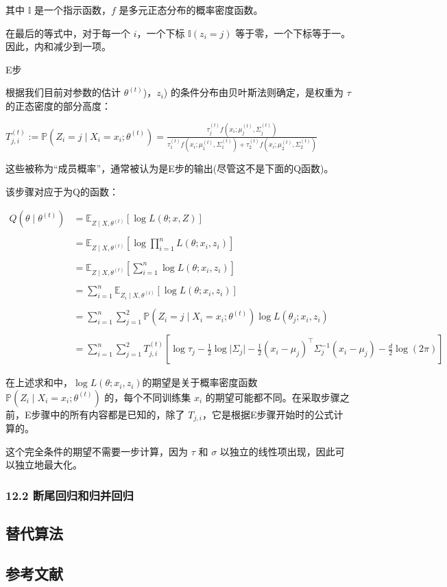 其中 $\mathbb{I}$ 是一个指示函数，$f$ 是多元正态分布的概率密度函数。

在最后的等式中，对于每一个 $i$，一个下标 $\mathbb{I}(z_i = j)$ 等于零，一个下标等于一。因此，内和减少到一项。

E步

根据我们目前对参数的估计 $\theta^{(t)}$)，$z_i$) 的条件分布由贝叶斯法则确定，是权重为 $\tau$ 的正态密度的部分高度：

$T_{j,i}^{(t)} := \mathbb{P}(Z_i = j \mid X_i = x_i; \theta^{(t)}) = \frac{ \tau_j^{(t)} f(x_i; \mu_j^{(t)}, \Sigma_j^{(t)})}{ \tau_1^{(t)} f(x_i; \mu_1^{(t)}, \Sigma_1^{(t)}) + \tau_2^{(t)} f(x_i; \mu_2^{(t)}, \Sigma_2^{(t)}) }$

这些被称为“成员概率”，通常被认为是E步的输出(尽管这不是下面的Q函数)。

该步骤对应于为Q的函数：

\begin{align}
Q(\theta \mid \theta^{(t)}) &= \mathbb{E}_{Z \mid X, \theta^{(t)}}[\log L(\theta; x, Z)] \\\\
&= \mathbb{E}_{Z \mid X, \theta^{(t)}}\left[\log \prod_{i=1}^{n} L(\theta; x_i, z_i)\right] \\\\
&= \mathbb{E}_{Z \mid X, \theta^{(t)}}\left[\sum_{i=1}^{n} \log L(\theta; x_i, z_i)\right] \\\\
&= \sum_{i=1}^{n} \mathbb{E}_{Z_i \mid X, \theta^{(t)}}[\log L(\theta; x_i, z_i)] \\\\
&= \sum_{i=1}^{n} \sum_{j=1}^{2} \mathbb{P}(Z_i = j \mid X_i = x_i; \theta^{(t)}) \log L(\theta_j; x_i, z_i) \\\\
&= \sum_{i=1}^{n} \sum_{j=1}^{2} T_{j,i}^{(t)} \left[\log \tau_j - \frac{1}{2} \log \lvert \Sigma_j \rvert - \frac{1}{2} (x_i - \mu_j)^\top \Sigma_j^{-1} (x_i - \mu_j) - \frac{d}{2} \log(2\pi)\right]~
\end{align}

在上述求和中，$\log L(\theta; x_i, z_i)$的期望是关于概率密度函数 $\mathbb{P}(Z_i \mid X_i = x_i; \theta^{(t)})$ 的，每个不同训练集 $x_i$ 的期望可能都不同。在采取步骤之前，E步骤中的所有内容都是已知的，除了 $T_{j,i}$，它是根据E步骤开始时的公式计算的。

这个完全条件的期望不需要一步计算，因为 $\tau$ 和 $\sigma$ 以独立的线性项出现，因此可以独立地最大化。


\subsubsection{12.2 断尾回归和归并回归}



\subsection{替代算法}



\subsection{参考文献}
